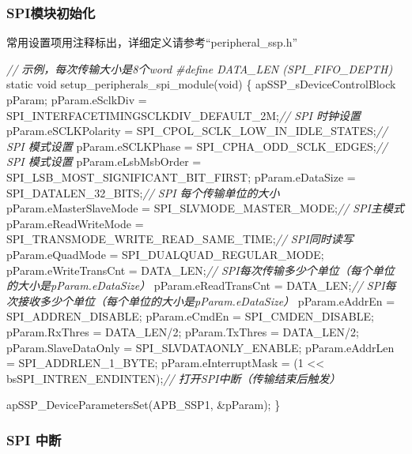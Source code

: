 \documentclass[
  12pt,
]{book}
\newenvironment{Shaded}{\begin{snugshade}}{\end{snugshade}}
\newcommand{\CommentTok}[1]{\textcolor[rgb]{0.56,0.35,0.01}{\textit{#1}}}
\newcommand{\DataTypeTok}[1]{\textcolor[rgb]{0.13,0.29,0.53}{#1}}
\newcommand{\DecValTok}[1]{\textcolor[rgb]{0.00,0.00,0.81}{#1}}
\newcommand{\NormalTok}[1]{#1}
\newcommand{\PreprocessorTok}[1]{\textcolor[rgb]{0.56,0.35,0.01}{\textit{#1}}}
\begin{document}
\hypertarget{spiux6a21ux5757ux521dux59cbux5316-4}{%
\subsubsection{SPI模块初始化}\label{spiux6a21ux5757ux521dux59cbux5316-4}}

常用设置项用注释标出，详细定义请参考``peripheral\_ssp.h''

\begin{Shaded}
\begin{Highlighting}[]
\CommentTok{// 示例，每次传输大小是8个word}
\PreprocessorTok{#define DATA_LEN (SPI_FIFO_DEPTH)}
\DataTypeTok{static} \DataTypeTok{void}\NormalTok{ setup_peripherals_spi_module(}\DataTypeTok{void}\NormalTok{)}
\NormalTok{\{}
\NormalTok{    apSSP_sDeviceControlBlock pParam;}
\NormalTok{    pParam.eSclkDiv = SPI_INTERFACETIMINGSCLKDIV_DEFAULT_2M;}\CommentTok{// SPI 时钟设置}
\NormalTok{    pParam.eSCLKPolarity = SPI_CPOL_SCLK_LOW_IN_IDLE_STATES;}\CommentTok{// SPI 模式设置}
\NormalTok{    pParam.eSCLKPhase = SPI_CPHA_ODD_SCLK_EDGES;}\CommentTok{// SPI 模式设置}
\NormalTok{    pParam.eLsbMsbOrder = SPI_LSB_MOST_SIGNIFICANT_BIT_FIRST;}
\NormalTok{    pParam.eDataSize = SPI_DATALEN_32_BITS;}\CommentTok{// SPI 每个传输单位的大小}
\NormalTok{    pParam.eMasterSlaveMode = SPI_SLVMODE_MASTER_MODE;}\CommentTok{// SPI主模式}
\NormalTok{    pParam.eReadWriteMode = SPI_TRANSMODE_WRITE_READ_SAME_TIME;}\CommentTok{// SPI同时读写}
\NormalTok{    pParam.eQuadMode = SPI_DUALQUAD_REGULAR_MODE;}
\NormalTok{    pParam.eWriteTransCnt = DATA_LEN;}\CommentTok{// SPI每次传输多少个单位（每个单位的大小是pParam.eDataSize）}
\NormalTok{    pParam.eReadTransCnt = DATA_LEN;}\CommentTok{// SPI每次接收多少个单位（每个单位的大小是pParam.eDataSize）}
\NormalTok{    pParam.eAddrEn = SPI_ADDREN_DISABLE;}
\NormalTok{    pParam.eCmdEn = SPI_CMDEN_DISABLE;}
\NormalTok{    pParam.RxThres = DATA_LEN/}\DecValTok{2}\NormalTok{;}
\NormalTok{    pParam.TxThres = DATA_LEN/}\DecValTok{2}\NormalTok{;}
\NormalTok{    pParam.SlaveDataOnly = SPI_SLVDATAONLY_ENABLE;}
\NormalTok{    pParam.eAddrLen = SPI_ADDRLEN_1_BYTE;}
\NormalTok{    pParam.eInterruptMask = (}\DecValTok{1}\NormalTok{ << bsSPI_INTREN_ENDINTEN);}\CommentTok{// 打开SPI中断（传输结束后触发）}
  
\NormalTok{    apSSP_DeviceParametersSet(APB_SSP1, &pParam);}
\NormalTok{\}}
\end{Highlighting}
\end{Shaded}

\hypertarget{spi-ux4e2dux65ad-3}{%
\subsubsection{SPI 中断}\label{spi-ux4e2dux65ad-3}}
\end{document}
